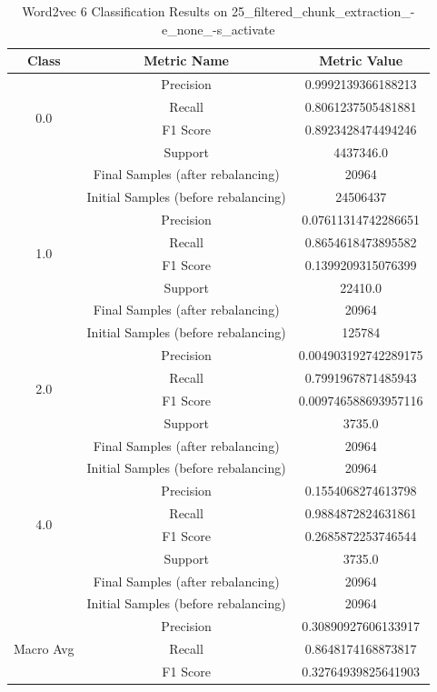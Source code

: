 \begin{longtable}{|c|c|c|}
\caption{Word2vec 6 Classification Results on 25\_filtered\_chunk\_extraction\_-e\_none\_-s\_activate} \label{tab:25_filtered_chunk_extraction_-e_none_-s_activate_word2vec_6_classifiers_results} \\
\hline
Class & Metric Name & Metric Value \\
\hline
\multirow{4}{*}{0.0} & Precision & 0.9992139366188213 \\
 & Recall & 0.8061237505481881 \\
 & F1 Score & 0.8923428474494246 \\
 & Support & 4437346.0 \\
 & Final Samples (after rebalancing) & 20964 \\
 & Initial Samples (before rebalancing) & 24506437 \\
\hline
\multirow{4}{*}{1.0} & Precision & 0.07611314742286651 \\
 & Recall & 0.8654618473895582 \\
 & F1 Score & 0.1399209315076399 \\
 & Support & 22410.0 \\
 & Final Samples (after rebalancing) & 20964 \\
 & Initial Samples (before rebalancing) & 125784 \\
\hline
\multirow{4}{*}{2.0} & Precision & 0.004903192742289175 \\
 & Recall & 0.7991967871485943 \\
 & F1 Score & 0.009746588693957116 \\
 & Support & 3735.0 \\
 & Final Samples (after rebalancing) & 20964 \\
 & Initial Samples (before rebalancing) & 20964 \\
\hline
\multirow{4}{*}{4.0} & Precision & 0.1554068274613798 \\
 & Recall & 0.9884872824631861 \\
 & F1 Score & 0.2685872253746544 \\
 & Support & 3735.0 \\
 & Final Samples (after rebalancing) & 20964 \\
 & Initial Samples (before rebalancing) & 20964 \\
\hline
\multirow{4}{*}{Macro Avg} & Precision & 0.30890927606133917 \\
 & Recall & 0.8648174168873817 \\
 & F1 Score & 0.32764939825641903 \\

\end{longtable}
